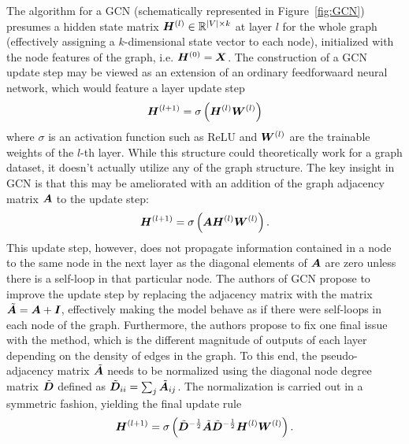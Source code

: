 The algorithm for a GCN (schematically represented in Figure~\ref{fig:GCN}) presumes a hidden state matrix \( \bm{H}^{(l)} \in \mathbb{R}^{\left\lvert V \right\rvert \times k} \) at layer \( l \) for the whole graph (effectively assigning a \( k \)-dimensional state vector to each node), initialized with the node features of the graph, i.e. \( \bm{H}^{(0)} = \bm{X} \). The construction of a GCN update step may be viewed as an extension of an ordinary feedforwaard neural network, which would feature a layer update step
\begin{equation}
	\bm{H}^{(l+1)} = \sigma \left( \bm{H}^{(l)} \bm{W}^{(l)} \right)
\end{equation}
where \( \sigma \) is an activation function such as ReLU and \( \bm{W}^{(l)} \) are the trainable weights of the \( l \)-th layer. While this structure could theoretically work for a graph dataset, it doesn't actually utilize any of the graph structure. The key insight in GCN is that this may be ameliorated with an addition of the graph adjacency matrix \( \bm{A} \) to the update step:
\begin{equation}
	\bm{H}^{(l+1)} = \sigma \left( \bm{A} \bm{H}^{(l)} \bm{W}^{(l)} \right).
\end{equation}
This update step, however, does not propagate information contained in a node to the same node in the next layer as the diagonal elements of \( \bm{A} \) are zero unless there is a self-loop in that particular node. The authors of GCN propose to improve the update step by replacing the adjacency matrix with the matrix \( \tilde{\bm{A}} = \bm{A} + \bm{I} \), effectively making the model behave as if there were self-loops in each node of the graph. Furthermore, the authors propose to fix one final issue with the method, which is the different magnitude of outputs of each layer depending on the density of edges in the graph. To this end, the pseudo-adjacency matrix \( \tilde{\bm{A}} \) needs to be normalized using the diagonal node degree matrix \( \tilde{\bm{D}} \) defined as \( \tilde{\bm{D}}_{ii} = \sum_j \tilde{\bm{A}}_{ij} \). The normalization is carried out in a symmetric fashion, yielding the final update rule
\begin{equation}\label{eq:GCN}
	\bm{H}^{(l+1)} = \sigma \left( \tilde{\bm{D}}^{-\frac{1}{2}} \tilde{\bm{A}} \tilde{\bm{D}}^{-\frac{1}{2}} \bm{H}^{(l)} \bm{W}^{(l)} \right).
\end{equation}
